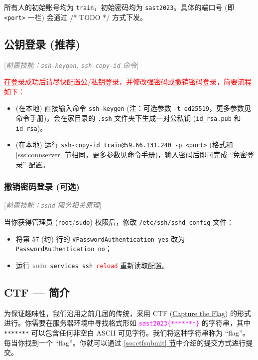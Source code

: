 \documentclass{article}
\begin{document}
	所有人的初始账号均为 \texttt{train}，初始密码均为 \texttt{sast2023}。具体的端口号 (即 \texttt{<port>} 一栏) 会通过 /* TODO */ 方式下发。

	\subsection{公钥登录 (推荐)}

	\textcolor{gray}{[\textit{前置技能：\texttt{ssh-keygen}, \texttt{ssh-copy-id} 命令}]}

	\textcolor{red}{在登录成功后请尽快配置公/私钥登录，并修改强密码或撤销密码登录，简要流程如下：}

	\begin{itemize}
		\itemsep0pt
		\item (在本地) 直接输入命令 \texttt{ssh-keygen} (注：可选参数 \texttt{-t ed25519}，更多参数见命令手册)，会在家目录的 \texttt{.ssh} 文件夹下生成一对公私钥 (\verb!id_rsa.pub! 和 \verb!id_rsa!)。
		\item (在本地) 运行 \texttt{ssh-copy-id train@59.66.131.240 -p <port>} (格式和 \hyperref[sss:connserver]{\ref*{sss:connserver} 节}相同，更多参数见命令手册)，输入密码后即可完成 ``免密登录'' 配置。
	\end{itemize}

	\subsubsection{撤销密码登录 (可选)}

	\textcolor{gray}{[\textit{前置技能：\texttt{sshd} 服务相关原理}]}

	当你获得管理员 (\texttt{root}/\texttt{sudo}) 权限后，修改 \verb!/etc/ssh/sshd_config! 文件：

	\begin{itemize}
		\itemsep0pt
		\item 将第 57 (约) 行的 \verb!#PasswordAuthentication yes! 改为 \texttt{PasswordAuthentication no}；
		\item 运行 \texttt{\textcolor{gray}{sudo} services ssh \textcolor{red}{reload}} 重新读取配置。
	\end{itemize}

	\subsection{CTF --- 简介}

	为保证趣味性，我们沿用之前几届的传统，采用 CTF (\href{https://en.wikipedia.org/wiki/Capture_the_flag_(cybersecurity)}{Capture the Flag}) 的形式进行。你需要在服务器环境中寻找格式形如 \textcolor{fuchsia}{\texttt{sast2023\{*******\}}} 的字符串，其中 \texttt{*******} 可以包含任何非空白 ASCII 可见字符。我们将这种字符串称为 ``flag''。每当你找到一个 ``flag''。你就可以通过 \hyperref[sss:ctfsubmit]{\ref*{sss:ctfsubmit} 节}中介绍的提交方式进行提交。\cite{sast2022-linux}
\end{document}
